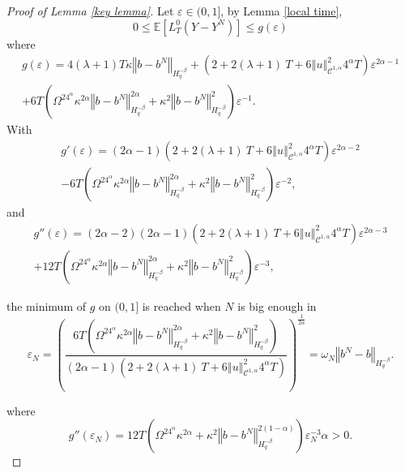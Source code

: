 \documentclass[11pt]{enstaPRE}
\newcommand{\norme}[1]{\left\Vert #1\right\Vert}
\newcommand{\E}{\mathbb{E}}
\begin{document}
\begin{proof}[Proof of Lemma \ref{key lemma}]
    Let $\varepsilon\in(0,1]$, by Lemma \ref{local time},    
    \begin{equation*}
    0\leq\E\left[L^0_T(Y-Y^N)\right]\leq g(\varepsilon)
    \end{equation*}
    where \begin{multline*}
    g(\varepsilon) = 4(\lambda + 1)T\kappa\norme{b-b^N}_{H^{-\beta}_{q}} + \left(2 + 2(\lambda + 1)\ T + 6\norme{u}_{\mathcal{C}^{1,\alpha}}^2 4^{\alpha}T\right) \varepsilon^{2\alpha-1} \\ + 6T\left(\Omega^24^{\alpha}\kappa^{2\alpha} \norme{b-b^N}_{H^{-\beta}_q}^{2\alpha}+\kappa^2\norme{b-b^N}_{H^{-\beta}_{q}}^2\right)\varepsilon^{-1}.
    \end{multline*}    
    With \begin{multline*}
    g'(\varepsilon)=(2\alpha-1)\left(2 + 2(\lambda + 1)\ T + 6\norme{u}_{\mathcal{C}^{1,\alpha}}^2 4^{\alpha}T\right)\varepsilon^{2\alpha-2}\\-6T\left(\Omega^24^{\alpha}\kappa^{2\alpha} \norme{b-b^N}_{H^{-\beta}_q}^{2\alpha}+\kappa^2\norme{b-b^N}_{H^{-\beta}_{q}}^2\right)\varepsilon^{-2},
    \end{multline*}
    and 
    \begin{multline*}
    g''(\varepsilon)=(2\alpha-2)(2\alpha-1)\left(2 + 2(\lambda + 1)\ T + 6\norme{u}_{\mathcal{C}^{1,\alpha}}^2 4^{\alpha}T\right)\varepsilon^{2\alpha-3}\\+12T\left(\Omega^24^{\alpha}\kappa^{2\alpha} \norme{b-b^N}_{H^{-\beta}_q}^{2\alpha}+\kappa^2\norme{b-b^N}_{H^{-\beta}_{q}}^2\right)\varepsilon^{-3},\end{multline*}
    
    the minimum of $g$ on $(0,1]$ is reached when $N$ is big enough in \begin{equation*}
    \varepsilon_N=\left(\frac{6T\left(\Omega^24^{\alpha}\kappa^{2\alpha} \norme{b-b^N}_{H^{-\beta}_q}^{2\alpha}+\kappa^2\norme{b-b^N}_{H^{-\beta}_{q}}^2\right)}{(2\alpha-1)\left(2 + 2(\lambda + 1)\ T + 6\norme{u}_{\mathcal{C}^{1,\alpha}}^2 4^{\alpha}T\right)}\right)^{\frac{1}{2\alpha}}=\omega_N \norme{b^N-b}_{H^{-\beta}_{q}}.
    \end{equation*}
    
    where 
    \begin{equation*}
    g''(\varepsilon_N)
    =12T\left(\Omega^24^{\alpha}\kappa^{2\alpha} +\kappa^2\norme{b-b^N}_{H^{-\beta}_{q}}^{2(1-\alpha)}\right)\varepsilon_N^{-3}\alpha>0.
    \end{equation*}
    

\end{proof}
\end{document}
